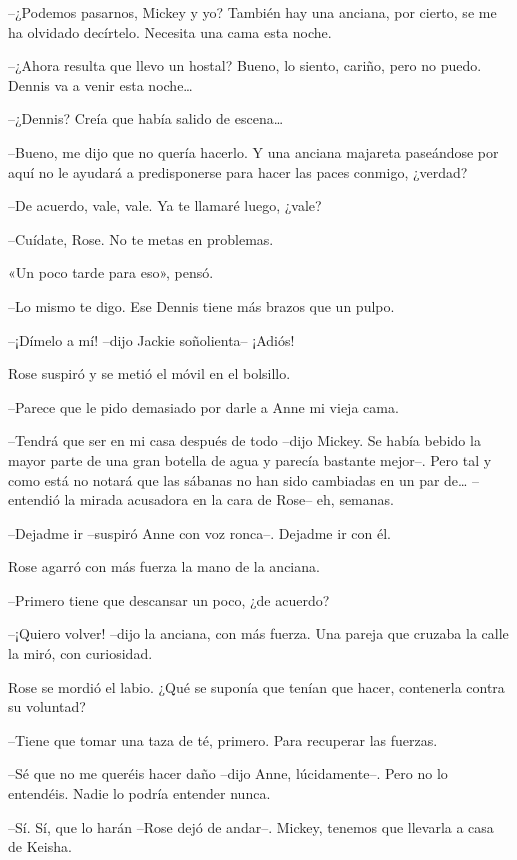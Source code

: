 {--¿Podemos pasarnos, Mickey y yo? También hay una anciana, por cierto,
se me ha olvidado decírtelo. Necesita una cama esta noche.}

{--¿Ahora resulta que llevo un hostal? Bueno, lo siento, cariño, pero no
 puedo. Dennis va a venir esta noche\ldots{}}

{--¿Dennis? Creía que había salido de escena\ldots{}}

{--Bueno, me dijo que no quería hacerlo. Y una anciana majareta
 paseándose por aquí no le ayudará a predisponerse para hacer las paces
conmigo, ¿verdad?}

{--De acuerdo, vale, vale. Ya te llamaré luego, ¿vale?}

{--Cuídate, Rose. No te metas en problemas.}

{«Un poco tarde para eso», pensó.}

{--Lo mismo te digo. Ese Dennis tiene más brazos que un pulpo.}

{--¡Dímelo a mí! --dijo Jackie soñolienta-- ¡Adiós!}

{Rose suspiró y se metió el móvil en el bolsillo.}

{--Parece que le pido demasiado por darle a Anne mi vieja cama.}

{--Tendrá que ser en mi casa después de todo --dijo Mickey. Se había
 bebido la mayor parte de una gran botella de agua y parecía bastante
 mejor--. Pero tal y como está no notará que las sábanas no han sido
 cambiadas en un par de\ldots{} --entendió la mirada acusadora en la cara
de Rose-- eh, semanas.}

{--Dejadme ir --suspiró Anne con voz ronca--. Dejadme ir con él.}

{Rose agarró con más fuerza la mano de la anciana.}

{--Primero tiene que descansar un poco, ¿de acuerdo?}

{--¡Quiero volver! --dijo la anciana, con más fuerza. Una pareja que
cruzaba la calle la miró, con curiosidad.}

{Rose se mordió el labio. ¿Qué se suponía que tenían que hacer,
contenerla contra su voluntad?}

{--Tiene que tomar una taza de té, primero. Para recuperar las fuerzas.}

{--Sé que no me queréis hacer daño --dijo Anne, lúcidamente--. Pero no
lo entendéis. Nadie lo podría entender nunca.}

{--Sí. Sí, que lo harán --Rose dejó de andar--. Mickey, tenemos que
llevarla a casa de Keisha.}

